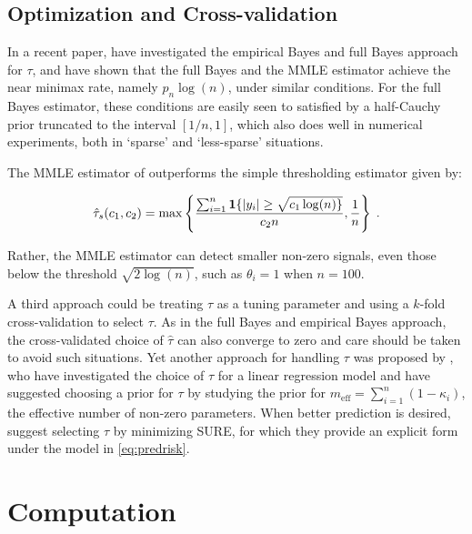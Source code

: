 \documentclass[sts,preprint]{imsart}
\begin{document}
\subsection{Optimization and Cross-validation} In a recent paper, \citet{van2017adaptive} have investigated the empirical Bayes and full Bayes approach for $\tau$, and have shown that the full Bayes and the MMLE estimator achieve the near minimax rate, namely $p_n \log(n)$, under similar conditions. For the full Bayes estimator, these conditions are easily seen to satisfied by a half-Cauchy prior truncated to the interval $[1/n,1]$, which also does well in numerical experiments, both in `sparse' and `less-sparse' situations. 

The MMLE estimator of \citet{van2017adaptive} outperforms the simple thresholding estimator given by:

\[
  \hat{\tau}_s(c_1, c_2) = \max \left \{ \frac{\sum_{i=1}^{n} {\bf 1} \{ \lvert y_i\rvert \ge
  \sqrt{c_1 \log(n) \}}}{c_2 n}, \frac{1}{n} \right\}
  \;.
\]

Rather, the MMLE estimator can detect smaller non-zero signals, even those below the threshold $\sqrt{2 \log(n)}$, such as $\theta_i = 1$ when $n = 100$. 


A third approach could be treating $\tau$ as a tuning parameter and using a $k$-fold cross-validation to select $\tau$.  As in the full Bayes and empirical Bayes approach, the cross-validated choice of $\hat{\tau}$ can also converge to zero and care should be taken to avoid such situations. Yet another approach for handling $\tau$ was proposed by \citet{piironen2016hyperprior}, who have investigated the choice of $\tau$ for a linear regression model and have suggested choosing a prior for $\tau$ by studying the prior for $m_{\text{eff}} = \sum_{i=1}^{n} (1-\kappa_i)$, the effective number of non-zero parameters. When better prediction is desired, \citet{bhadra2016prediction} suggest selecting $\tau$ by minimizing SURE, for which they provide an explicit form under the model in \eqref{eq:predrisk}. 


\section{Computation}\label{sec:horse-comp}
\end{document}
